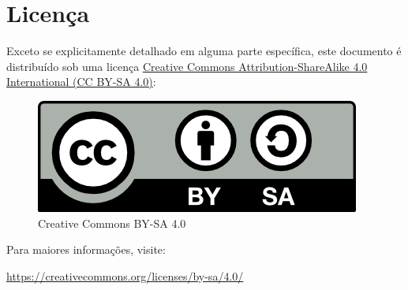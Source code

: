 \section{Licença}
\label{sec:license}

Exceto se explicitamente detalhado em alguma parte específica, este documento
é distribuído sob uma licença
\href{https://creativecommons.org/licenses/by-sa/4.0/}{Creative Commons
Attribution-ShareAlike 4.0 International (CC BY-SA 4.0)}:

\begin{figure}[H]
  \centering
  \caption{Creative Commons BY-SA 4.0}
  \label{fig:cc}
     \includegraphics[scale=1]{imagens/cc-by-sa.png}
\end{figure}

Para maiores informações, visite:

\href{https://creativecommons.org/licenses/by-sa/4.0/}{%
https://creativecommons.org/licenses/by-sa/4.0/}
